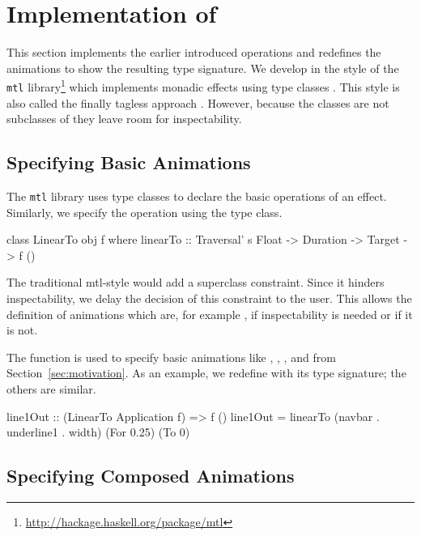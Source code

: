 \section{Implementation of \dsl{}}
\label{sec:detail}

This section implements the earlier introduced operations and redefines the animations to show the resulting type signature. We
develop \dsl{} in the style of the \texttt{mtl}
library\footnote{\url{http://hackage.haskell.org/package/mtl}} which implements
monadic effects using type classes \cite{DBLP:conf/afp/Jones95}.  This style is
also called the finally tagless approach \cite{DBLP:journals/jfp/CaretteKS09}.
However, because the \dsl{} classes are not subclasses of  they leave
room for inspectability.

\subsection{Specifying Basic Animations}

The \texttt{mtl} library uses type classes to declare the basic operations of an
effect. Similarly, we specify the  operation using
the  type class.

\begin{code}
class LinearTo obj f where
  linearTo :: Traversal' s Float -> Duration -> Target -> f ()
\end{code}

The traditional mtl-style would add a  superclass constraint. Since
it hinders inspectability, we delay the decision of this constraint to the user.
This allows the definition of animations which are, for example ,
if inspectability is needed or  if it is not.

The  function is used to specify basic
animations like , ,
, and  from
Section~\ref{sec:motivation}. 
As an example, we redefine  with its type signature; the others 
are similar. 

\begin{code}
line1Out :: (LinearTo Application f) => f ()
line1Out = linearTo (navbar . underline1 . width) (For 0.25) (To 0)
\end{code}

\subsection{Specifying Composed Animations}

